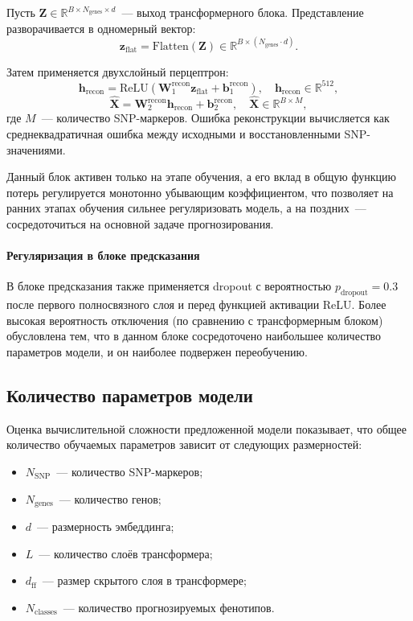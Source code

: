 Пусть $\mathbf{Z} \in \mathbb{R}^{B \times N_{\text{genes}} \times d}$~--- 
выход трансформерного блока. Представление разворачивается в одномерный 
вектор:
\[
\mathbf{z}_{\text{flat}} = \text{Flatten}(\mathbf{Z}) \in 
\mathbb{R}^{B \times (N_{\text{genes}} \cdot d)}.
\]

Затем применяется двухслойный перцептрон:
\[
\mathbf{h}_{\text{recon}} = \text{ReLU}(\mathbf{W}_1^{\text{recon}} 
\mathbf{z}_{\text{flat}} + \mathbf{b}_1^{\text{recon}}), \quad
\mathbf{h}_{\text{recon}} \in \mathbb{R}^{512},
\]
\[
\hat{\mathbf{X}} = \mathbf{W}_2^{\text{recon}} \mathbf{h}_{\text{recon}} + 
\mathbf{b}_2^{\text{recon}}, \quad
\hat{\mathbf{X}} \in \mathbb{R}^{B \times M},
\]
где $M$~--- количество SNP-маркеров. Ошибка реконструкции вычисляется как 
среднеквадратичная ошибка между исходными и восстановленными SNP-значениями.

Данный блок активен только на этапе обучения, а его вклад в общую функцию 
потерь регулируется монотонно убывающим коэффициентом, что позволяет на ранних 
этапах обучения сильнее регуляризовать модель, а на поздних~--- сосредоточиться 
на основной задаче прогнозирования.

\paragraph{Регуляризация в блоке предсказания}

В блоке предсказания также применяется dropout с вероятностью 
$p_{\text{dropout}} = 0.3$ после первого полносвязного слоя и перед 
функцией активации ReLU. Более высокая вероятность отключения 
(по сравнению с трансформерным блоком) обусловлена тем, что в данном 
блоке сосредоточено наибольшее количество параметров модели, и он 
наиболее подвержен переобучению.

\subsection{Количество параметров модели}

Оценка вычислительной сложности предложенной модели показывает, что общее 
количество обучаемых параметров зависит от следующих размерностей:
\begin{itemize}
	\item $N_{\text{SNP}}$~--- количество SNP-маркеров;
	\item $N_{\text{genes}}$~--- количество генов;
	\item $d$~--- размерность эмбеддинга;
	\item $L$~--- количество слоёв трансформера;
	\item $d_{\text{ff}}$~--- размер скрытого слоя в трансформере;
	\item $N_{\text{classes}}$~--- количество прогнозируемых фенотипов.
\end{itemize}

